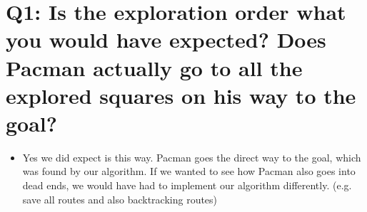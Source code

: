 


\newcommand{\veranstaltung}{Künstliche Intelligenz}
\newcommand{\semester}{SoSe21}
\newcommand{\studenten}{Jonny Lam \& Thore Brehmer}
\newcommand{\ubungNo}{1}





\section{Q1: Is the exploration order what you would have expected? Does Pacman actually go to all the
explored squares on his way to the goal?}
\begin{itemize}
    \item Yes we did expect is this way. Pacman goes the direct way to the goal, which was found by our algorithm. If we wanted to see how Pacman also goes into dead ends, we would have had to implement our algorithm differently. (e.g. save all routes and also backtracking routes)
\end{itemize}


